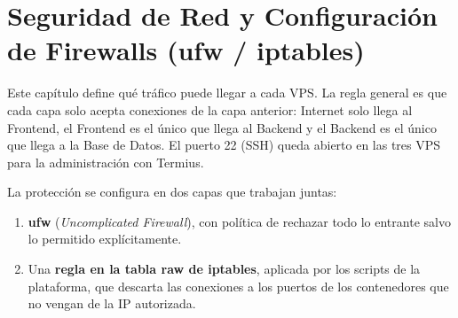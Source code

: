 \section{Seguridad de Red y Configuración de Firewalls (ufw / iptables)}\label{cap:03_seguridad_red_firewall}
Este capítulo define qué tráfico puede llegar a cada VPS. La regla general es que cada capa solo acepta conexiones de la capa anterior: Internet solo llega al Frontend, el Frontend es el único que llega al Backend y el Backend es el único que llega a la Base de Datos. El puerto 22 (SSH) queda abierto en las tres VPS para la administración con Termius.

La protección se configura en dos capas que trabajan juntas:
\begin{enumerate}
  \item \textbf{ufw} (\emph{Uncomplicated Firewall}), con política de rechazar todo lo entrante salvo lo permitido explícitamente.
  \item Una \textbf{regla en la tabla raw de iptables}, aplicada por los scripts de la plataforma, que descarta las conexiones a los puertos de los contenedores que no vengan de la IP autorizada.
\end{enumerate}





